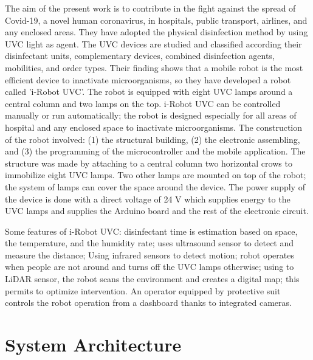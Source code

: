 \documentclass[letterpaper]{article} %
\begin{document}
\cite{Guettari2020} The aim of the present work is to contribute in the fight against the spread of Covid-19, a novel human coronavirus, in hospitals, public transport, airlines, and any enclosed areas. They have adopted the physical disinfection method by using UVC light as agent. The UVC devices are studied and classified according their disinfectant units, complementary devices, combined disinfection agents, mobilities, and order types. Their finding shows that a mobile robot is the most efficient device to inactivate microorganisms, so they have developed a robot called 'i-Robot UVC'. The robot is equipped with eight UVC lamps around a central column and two lamps on the top. 
i-Robot UVC can be controlled manually or run automatically; the robot is designed especially for all areas of hospital and any enclosed space to inactivate microorganisms. The construction of the robot involved: (1) the structural building, (2) the electronic assembling, and (3) the programming of the microcontroller and the mobile application.
The structure was made by attaching to a central column two horizontal crows to immobilize eight UVC lamps. Two other lamps are mounted on top of the robot; the system of lamps can cover the space around the device. The power supply of the device is done with a direct voltage of 24 V which supplies energy to the UVC lamps and supplies the Arduino board and the rest of the electronic circuit.

Some features of i-Robot UVC:   disinfectant time is estimation based on space,  the temperature, and the humidity rate; uses ultrasound sensor to detect and measure the distance; Using infrared sensors  to detect motion;  robot operates when people are not around and turns off the UVC lamps otherwise; using  to LiDAR sensor, the robot scans the environment and creates a digital map; this permits to optimize intervention. An operator equipped by protective suit controls the robot operation from a dashboard thanks to integrated cameras.



\section{System Architecture}
\label{sec:SystemArchitecture}

\end{document}
